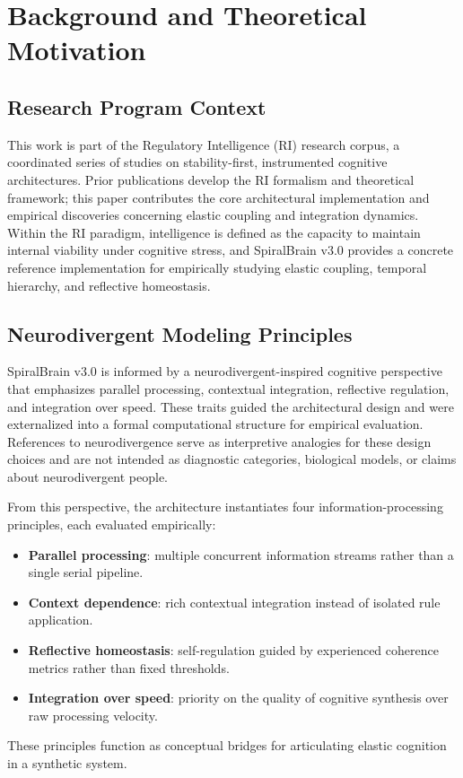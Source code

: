 \documentclass[11pt,a4paper]{article}
\begin{document}
\section{Background and Theoretical Motivation}
\label{sec:background}

\subsection{Research Program Context}

This work is part of the Regulatory Intelligence (RI) research corpus, a coordinated series of studies on stability-first, instrumented cognitive architectures. Prior publications develop the RI formalism and theoretical framework; this paper contributes the core architectural implementation and empirical discoveries concerning elastic coupling and integration dynamics. Within the RI paradigm, intelligence is defined as the capacity to maintain internal viability under cognitive stress, and SpiralBrain v3.0 provides a concrete reference implementation for empirically studying elastic coupling, temporal hierarchy, and reflective homeostasis.

\subsection{Neurodivergent Modeling Principles}

SpiralBrain v3.0 is informed by a neurodivergent-inspired cognitive perspective that emphasizes parallel processing, contextual integration, reflective regulation, and integration over speed. These traits guided the architectural design and were externalized into a formal computational structure for empirical evaluation. References to neurodivergence serve as interpretive analogies for these design choices and are not intended as diagnostic categories, biological models, or claims about neurodivergent people.

From this perspective, the architecture instantiates four information-processing principles, each evaluated empirically:
\begin{itemize}[leftmargin=2em]
    \item \textbf{Parallel processing}: multiple concurrent information streams rather than a single serial pipeline.
    \item \textbf{Context dependence}: rich contextual integration instead of isolated rule application.
    \item \textbf{Reflective homeostasis}: self-regulation guided by experienced coherence metrics rather than fixed thresholds.
    \item \textbf{Integration over speed}: priority on the quality of cognitive synthesis over raw processing velocity.
\end{itemize}
These principles function as conceptual bridges for articulating elastic cognition in a synthetic system.
\end{document}
